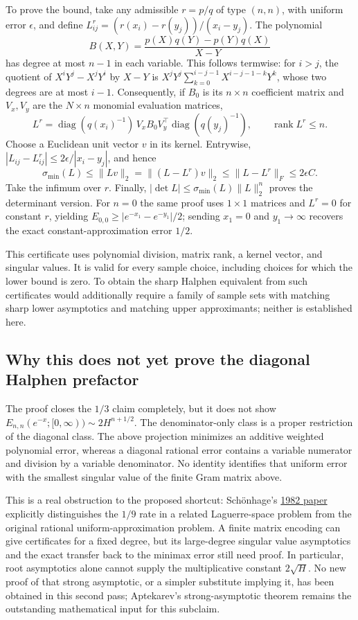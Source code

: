 \documentclass[11pt]{article}
\theoremstyle{remark}
\numberwithin{equation}{section}
\begin{document}
To prove the bound, take any admissible $r=p/q$ of type $(n,n)$,
with uniform error $\epsilon$, and define
$L^r_{ij}=(r(x_i)-r(y_j))/(x_i-y_j)$.
The polynomial
\[
 B(X,Y)=\frac{p(X)q(Y)-p(Y)q(X)}{X-Y}
\]
has degree at most $n-1$ in each variable.  This follows termwise:
for $i>j$, the quotient of $X^iY^j-X^jY^i$ by $X-Y$ is
$X^jY^j\sum_{k=0}^{i-j-1}X^{i-j-1-k}Y^k$, whose two degrees
are at most $i-1$.  Consequently, if $B_0$ is its $n\times n$
coefficient matrix and $V_x,V_y$ are the $N\times n$ monomial
evaluation matrices,
\[
 L^r=\operatorname{diag}(q(x_i)^{-1})\,V_xB_0V_y^\top
           \operatorname{diag}(q(y_j)^{-1}),
 \qquad \operatorname{rank}L^r\le n.
\]
Choose a Euclidean unit vector $v$ in its kernel.  Entrywise,
$|L_{ij}-L^r_{ij}|\le2\epsilon/|x_i-y_j|$, and hence
\[
 \sigma_{\min}(L)\le\|Lv\|_2
 =\|(L-L^r)v\|_2\le\|L-L^r\|_F\le2\epsilon C.
\]
Take the infimum over $r$.  Finally,
$|\det L|\le\sigma_{\min}(L)\|L\|_2^n$ proves the determinant
version.  For $n=0$ the same proof uses $1\times1$ matrices and
$L^r=0$ for constant $r$, yielding
$E_{0,0}\ge|e^{-x_1}-e^{-y_1}|/2$; sending $x_1=0$ and
$y_1\to\infty$ recovers the exact constant-approximation error $1/2$.

This certificate uses polynomial division, matrix rank, a kernel vector,
and singular values.  It is valid for every sample choice, including
choices for which the lower bound is zero.  To obtain the sharp Halphen
equivalent from such certificates would additionally require a family
of sample sets with matching sharp lower asymptotics and matching
upper approximants; neither is established here.

\subsection{Why this does not yet prove the diagonal Halphen prefactor}
The proof closes the $1/3$ claim completely, but it does not show
$E_{n,n}(e^{-x};[0,\infty))\sim2H^{n+1/2}$.
The denominator-only class is a proper restriction of the diagonal
class.  The above projection minimizes an additive weighted
polynomial error, whereas a diagonal rational error contains a
variable numerator and division by a variable denominator.  No
identity identifies that uniform error with the smallest singular
value of the finite Gram matrix above.

This is a real obstruction to the proposed shortcut: Sch\"onhage's
\href{https://doi.org/10.1137/0719077}{1982 paper} explicitly distinguishes
the $1/9$ rate in a related Laguerre-space problem from the original
rational uniform-approximation problem.  A finite matrix encoding can
give certificates for a fixed degree, but its large-degree singular
value asymptotics and the exact transfer back to the minimax error
still need proof.  In particular, root asymptotics alone cannot supply
the multiplicative constant $2\sqrt H$.
No new proof of that strong asymptotic, or a simpler substitute implying
it, has been obtained in this second pass; Aptekarev's strong-asymptotic
theorem remains the outstanding mathematical input for this subclaim.
\end{document}
